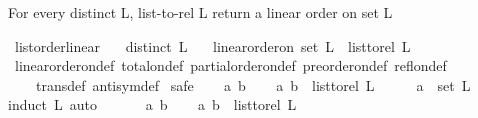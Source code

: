 \begin{isabellebody}
%
\endisadelimproof
%
\begin{isamarkuptext}%
For every distinct L, list-to-rel L return a linear order on set L%
\end{isamarkuptext}\isamarkuptrue%
\isamarkupfalse%
\ list{\isacharunderscore}{\kern0pt}order{\isacharunderscore}{\kern0pt}linear{\isacharcolon}{\kern0pt}\isanewline
\ \ \ {\isachardoublequoteopen}distinct\ L{\isachardoublequoteclose}\isanewline
\ \ \ {\isachardoublequoteopen}linear{\isacharunderscore}{\kern0pt}order{\isacharunderscore}{\kern0pt}on\ {\isacharparenleft}{\kern0pt}set\ L{\isacharparenright}{\kern0pt}\ \ {\isacharparenleft}{\kern0pt}list{\isacharunderscore}{\kern0pt}to{\isacharunderscore}{\kern0pt}rel\ L{\isacharparenright}{\kern0pt}{\isachardoublequoteclose}\ \isanewline
%
\isadelimproof
\ \ %
\endisadelimproof
%
\isatagproof
{}\isamarkupfalse%
\ linear{\isacharunderscore}{\kern0pt}order{\isacharunderscore}{\kern0pt}on{\isacharunderscore}{\kern0pt}def\ total{\isacharunderscore}{\kern0pt}on{\isacharunderscore}{\kern0pt}def\ partial{\isacharunderscore}{\kern0pt}order{\isacharunderscore}{\kern0pt}on{\isacharunderscore}{\kern0pt}def\ preorder{\isacharunderscore}{\kern0pt}on{\isacharunderscore}{\kern0pt}def\ refl{\isacharunderscore}{\kern0pt}on{\isacharunderscore}{\kern0pt}def\isanewline
\ \ \ \ trans{\isacharunderscore}{\kern0pt}def\ antisym{\isacharunderscore}{\kern0pt}def\ \isanewline
{}\isamarkupfalse%
{\isacharparenleft}{\kern0pt}safe{\isacharparenright}{\kern0pt}\isanewline
\ \ \isamarkupfalse%
\ a\ b\isanewline
\ \ \isamarkupfalse%
\ {\isachardoublequoteopen}{\isacharparenleft}{\kern0pt}a{\isacharcomma}{\kern0pt}\ b{\isacharparenright}{\kern0pt}\ {\isasymin}\ list{\isacharunderscore}{\kern0pt}to{\isacharunderscore}{\kern0pt}rel\ L{\isachardoublequoteclose}\isanewline
\ \ \isamarkupfalse%
\ \isamarkupfalse%
\ {\isachardoublequoteopen}a\ {\isasymin}\ set\ L{\isachardoublequoteclose}\ \isanewline
\ \ \isamarkupfalse%
{\isacharparenleft}{\kern0pt}induct\ L{\isacharcomma}{\kern0pt}\ auto{\isacharparenright}{\kern0pt}\ \isamarkupfalse%
\isanewline
{}\isamarkupfalse%
\ \isanewline
\ \ \isamarkupfalse%
\ a\ b\isanewline
\ \ \isamarkupfalse%
\ {\isachardoublequoteopen}{\isacharparenleft}{\kern0pt}a{\isacharcomma}{\kern0pt}\ b{\isacharparenright}{\kern0pt}\ {\isasymin}\ list{\isacharunderscore}{\kern0pt}to{\isacharunderscore}{\kern0pt}rel\ L{\isachardoublequoteclose}\isanewline

\end{isabellebody}
